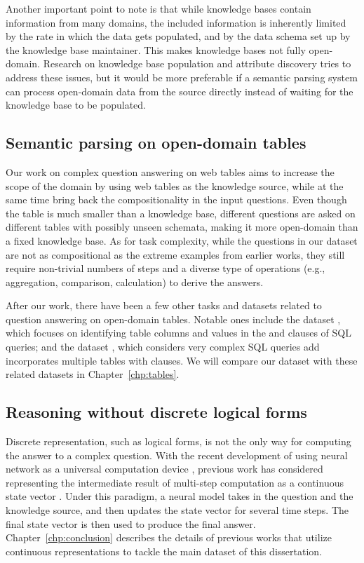 Another important point to note is that while knowledge bases
contain information from many domains,
the included information is inherently limited
by the rate in which the data gets populated,
and by the data schema set up by the knowledge base maintainer.
This makes knowledge bases not fully open-domain.
Research on knowledge base population \cite{ji2011knowledge,ellis2015tackbp,stanford2017kbp}
and attribute discovery \cite{cafarella2008webtables,yakout2012infogather}
tries to address these issues,
but it would be more preferable if a semantic parsing system
can process open-domain data from the source directly
instead of waiting for the knowledge base to be populated.

\subsection{Semantic parsing on open-domain tables}

Our work on complex question answering on web tables
aims to increase the scope of the domain
by using web tables as the knowledge source,
while at the same time bring back the compositionality
in the input questions.
Even though the table is much smaller than a knowledge base,
different questions are asked on different tables
with possibly unseen schemata,
making it more open-domain than a fixed knowledge base.
As for task complexity,
while the questions in our dataset are not as compositional
as the extreme examples from earlier works,
they still require non-trivial numbers of steps
and a diverse type of operations (e.g., aggregation,
comparison, calculation) to derive the answers.

After our work, there have been a few other tasks
and datasets related to question answering on open-domain tables.
Notable ones include the  dataset
\cite{zhong2017seq2sql},
which focuses on identifying table columns and values
in the  and  clauses of SQL queries;
and the  dataset
\cite{yu2018syntaxsqlnet,yu2018spider},
which considers very complex SQL queries add incorporates
multiple tables with  clauses.
We will compare our dataset with these related datasets
in Chapter~\ref{chp:tables}.

\subsection{Reasoning without discrete logical forms}
Discrete representation, such as logical forms,
is not the only way for computing the answer to a complex question.
With the recent development of using neural network
as a universal computation device
\cite{graves2014neural,weston2015memory,reed2016neural},
previous work has considered representing
the intermediate result of multi-step computation
as a continuous state vector
\cite{neelakantan2016neural,yin2016neural,mou2017coupling,iyyer2017search}.
Under this paradigm,
a neural model takes in the question and the knowledge source,
and then updates the state vector for several time steps.
The final state vector is then used to produce the final answer.
Chapter~\ref{chp:conclusion} describes the details of previous works
that utilize continuous representations to tackle the main dataset
of this dissertation.

